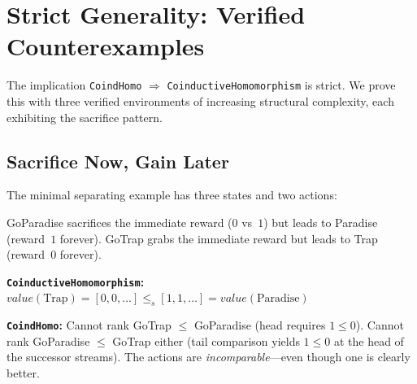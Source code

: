\documentclass[runningheads]{llncs}
\begin{document}

\section{Strict Generality: Verified Counterexamples}\label{sec:strict-generality}

The implication \texttt{CoindHomo} $\Rightarrow$ \texttt{CoinductiveHomomorphism} is strict.  We prove this with three verified environments of increasing structural complexity, each exhibiting the sacrifice pattern.

\subsection{Sacrifice Now, Gain Later}

The minimal separating example has three states and two actions:

\begin{center}
\end{center}

GoParadise sacrifices the immediate reward ($0$ vs~$1$) but leads to Paradise (reward~$1$ forever).  GoTrap grabs the immediate reward but leads to Trap (reward~$0$ forever).

\textbf{\texttt{CoinductiveHomomorphism}:} $\mathit{value}(\text{Trap}) = [0,0,\ldots] \le_s [1,1,\ldots] = \mathit{value}(\text{Paradise})$ \checkmark

\textbf{\texttt{CoindHomo}:} Cannot rank GoTrap $\le$ GoParadise (head requires $1 \le 0$). Cannot rank GoParadise $\le$ GoTrap either (tail comparison yields $1 \le 0$ at the head of the successor streams). The actions are \emph{incomparable}---even though one is clearly better.
\end{document}
